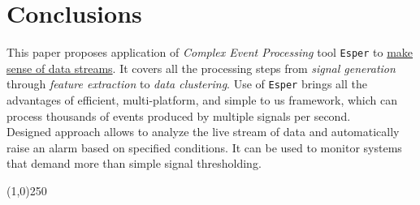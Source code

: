 \documentclass[11pt, letterpaper]{article}            %
\begin{document}
\section{Conclusions}
This paper proposes application of \emph{Complex Event Processing} tool \texttt{Esper} to \underline{make sense of data streams}. It covers all the processing steps from \emph{signal generation} through \emph{feature extraction} to \emph{data clustering}. Use of \texttt{Esper} brings all the advantages of efficient, multi-platform, and simple to us framework, which can process thousands of events produced by multiple signals per second.\\

Designed approach allows to analyze the live stream of data and automatically raise an alarm based on specified conditions. It can be used to monitor systems that demand more than simple signal thresholding.\\



\begin{center} \noindent \line(1,0){250} \end{center}       %


\newpage                                                                 %
{}

\end{document}
